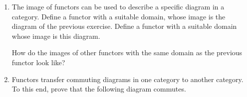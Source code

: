 \documentclass{scrartcl}
\begin{document}
\begin{enumerate}
\item
  The image of functors can be used to describe a specific diagram in a category.
  Define a functor with a suitable domain, whose image is the diagram of the previous exercise.
  Define a functor with a suitable domain whose image is this diagram.
  \begin{center}
  \end{center}
  How do the images of other functors with the same domain as the previous functor look like?

\item Functors transfer commuting diagrams in one category to another category.
  To this end, prove that the following diagram commutes.
  \begin{center}
  \end{center}


\end{enumerate}



\end{document}
